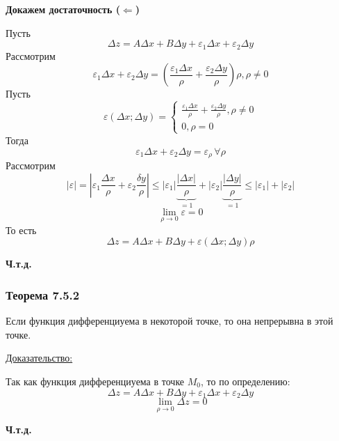\documentclass[12pt]{article}
\begin{document}
\begin{adjustwidth}{1.5em}{1.5em}
        \textbf{Докажем достаточность ($\Leftarrow$)}\par\noindent
        Пусть 
        \[ \Delta z = A \Delta x + B \Delta y + \varepsilon_1 \Delta x + \varepsilon_2 \Delta y \]
        Рассмотрим 
        \[ \varepsilon_1 \Delta x + \varepsilon_2 \Delta y = \left( \frac{\varepsilon_1 \Delta x}{\rho} + \frac{\varepsilon_2 \Delta y}{\rho} \right) \rho, \rho \ne 0 \]
        Пусть
        \[ \varepsilon(\Delta x; \Delta y) = \begin{cases}
            \frac{\varepsilon_1 \Delta x}{\rho} + \frac{\varepsilon_2 \Delta y}{\rho}, \rho \ne 0\\
            0, \rho = 0
        \end{cases} \]
        Тогда
        \[ \varepsilon_1 \Delta x + \varepsilon_2 \Delta y = \varepsilon_\rho\, \forall \rho \]
        Рассмотрим
        \[ |\varepsilon| = \left| \varepsilon_1 \frac{\Delta x}{\rho} + \varepsilon_2 \frac{\delta y}{\rho} \right| \le |\varepsilon_1| \underbrace{\frac{|\Delta x|}{\rho}}_{= 1} + |\varepsilon_2| \underbrace{\frac{|\Delta y|}{\rho}}_{= 1} \le |\varepsilon_1| + |\varepsilon_2| \]
        \[ \lim_{\rho \to 0}\varepsilon = 0 \]
        То есть
        \[ \Delta z = A \Delta x + B \Delta y + \varepsilon (\Delta x; \Delta y)\rho \]
        \begin{center}
            \textbf{Ч.т.д.}
        \end{center}
    \end{adjustwidth}
    \subsubsection*{Теорема 7.5.2}\label{th:7.5.2}
    Если функция дифференциуема в некоторой точке, то она непрерывна в этой точке.\par\noindent
    \underline{Доказательство:}
    \begin{adjustwidth}{1.5em}{1.5em}
        Так как функция дифференциуема в точке $M_0$, то по определению:
        \[ \Delta z = A \Delta x + B \Delta y + \varepsilon_1 \Delta x + \varepsilon_2 \Delta y \]
        \[ \lim_{\rho \to 0} \Delta z = 0 \]
        \begin{center}
            \textbf{Ч.т.д.}
        \end{center}
    \end{adjustwidth}
\end{document}
